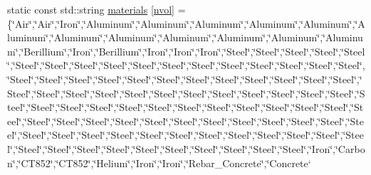 \begin{DoxyCompactItemize}
static const std\-::string \hyperlink{namespace_i_map_a7a8bdb02cfec3fed7ca49392098e6f61}{materials} \mbox{[}\hyperlink{namespace_i_map_a9e84d12837376356ab193324552af029}{nvol}\mbox{]} = \{\char`\"{}Air\char`\"{},\char`\"{}Air\char`\"{},\char`\"{}Iron\char`\"{},\char`\"{}Aluminum\char`\"{},\char`\"{}Aluminum\char`\"{},\char`\"{}Aluminum\char`\"{},\char`\"{}Aluminum\char`\"{},\char`\"{}Aluminum\char`\"{},\char`\"{}Aluminum\char`\"{},\char`\"{}Aluminum\char`\"{},\char`\"{}Aluminum\char`\"{},\char`\"{}Aluminum\char`\"{},\char`\"{}Aluminum\char`\"{},\char`\"{}Aluminum\char`\"{},\char`\"{}Aluminum\char`\"{},\char`\"{}Berillium\char`\"{},\char`\"{}Iron\char`\"{},\char`\"{}Berillium\char`\"{},\char`\"{}Iron\char`\"{},\char`\"{}Iron\char`\"{},\char`\"{}Iron\char`\"{},\char`\"{}Steel\char`\"{},\char`\"{}Steel\char`\"{},\char`\"{}Steel\char`\"{},\char`\"{}Steel\char`\"{},\char`\"{}Steel\char`\"{},\char`\"{}Steel\char`\"{},\char`\"{}Steel\char`\"{},\char`\"{}Steel\char`\"{},\char`\"{}Steel\char`\"{},\char`\"{}Steel\char`\"{},\char`\"{}Steel\char`\"{},\char`\"{}Steel\char`\"{},\char`\"{}Steel\char`\"{},\char`\"{}Steel\char`\"{},\char`\"{}Steel\char`\"{},\char`\"{}Steel\char`\"{},\char`\"{}Steel\char`\"{},\char`\"{}Steel\char`\"{},\char`\"{}Steel\char`\"{},\char`\"{}Steel\char`\"{},\char`\"{}Steel\char`\"{},\char`\"{}Steel\char`\"{},\char`\"{}Steel\char`\"{},\char`\"{}Steel\char`\"{},\char`\"{}Steel\char`\"{},\char`\"{}Steel\char`\"{},\char`\"{}Steel\char`\"{},\char`\"{}Steel\char`\"{},\char`\"{}Steel\char`\"{},\char`\"{}Steel\char`\"{},\char`\"{}Steel\char`\"{},\char`\"{}Steel\char`\"{},\char`\"{}Steel\char`\"{},\char`\"{}Steel\char`\"{},\char`\"{}Steel\char`\"{},\char`\"{}Steel\char`\"{},\char`\"{}Steel\char`\"{},\char`\"{}Steel\char`\"{},\char`\"{}Steel\char`\"{},\char`\"{}Steel\char`\"{},\char`\"{}Steel\char`\"{},\char`\"{}Steel\char`\"{},\char`\"{}Steel\char`\"{},\char`\"{}Steel\char`\"{},\char`\"{}Steel\char`\"{},\char`\"{}Steel\char`\"{},\char`\"{}Steel\char`\"{},\char`\"{}Steel\char`\"{},\char`\"{}Steel\char`\"{},\char`\"{}Steel\char`\"{},\char`\"{}Steel\char`\"{},\char`\"{}Steel\char`\"{},\char`\"{}Steel\char`\"{},\char`\"{}Steel\char`\"{},\char`\"{}Steel\char`\"{},\char`\"{}Steel\char`\"{},\char`\"{}Steel\char`\"{},\char`\"{}Steel\char`\"{},\char`\"{}Steel\char`\"{},\char`\"{}Steel\char`\"{},\char`\"{}Steel\char`\"{},\char`\"{}Steel\char`\"{},\char`\"{}Steel\char`\"{},\char`\"{}Steel\char`\"{},\char`\"{}Steel\char`\"{},\char`\"{}Steel\char`\"{},\char`\"{}Steel\char`\"{},\char`\"{}Steel\char`\"{},\char`\"{}Steel\char`\"{},\char`\"{}Steel\char`\"{},\char`\"{}Steel\char`\"{},\char`\"{}Steel\char`\"{},\char`\"{}Steel\char`\"{},\char`\"{}Steel\char`\"{},\char`\"{}Steel\char`\"{},\char`\"{}Steel\char`\"{},\char`\"{}Steel\char`\"{},\char`\"{}Steel\char`\"{},\char`\"{}Steel\char`\"{},\char`\"{}Steel\char`\"{},\char`\"{}Steel\char`\"{},\char`\"{}Steel\char`\"{},\char`\"{}Steel\char`\"{},\char`\"{}Steel\char`\"{},\char`\"{}Steel\char`\"{},\char`\"{}Steel\char`\"{},\char`\"{}Steel\char`\"{},\char`\"{}Steel\char`\"{},\char`\"{}Iron\char`\"{},\char`\"{}Carbon\char`\"{},\char`\"{}C\-T852\char`\"{},\char`\"{}C\-T852\char`\"{},\char`\"{}Helium\char`\"{},\char`\"{}Iron\char`\"{},\char`\"{}Iron\char`\"{},\char`\"{}Rebar\-\_\-\-Concrete\char`\"{},\char`\"{}Concrete\char`\
\end{DoxyCompactItemize}
